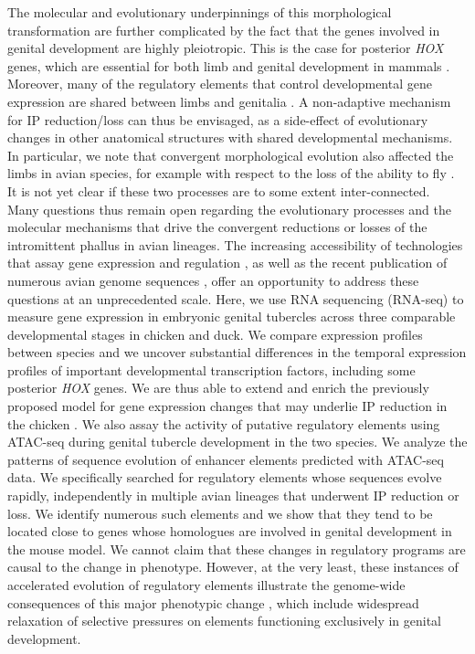 The molecular and evolutionary underpinnings of this morphological transformation are further complicated by the fact that the genes involved in genital development are highly pleiotropic. This is the case for posterior \textit{HOX} genes, which are essential for both limb and genital development in mammals \citep{mortlock_mutation_1997}. Moreover, many of the regulatory elements that control developmental gene expression are shared between limbs and genitalia \citep{lonfat_convergent_2014,infante_shared_2015}. A non-adaptive mechanism for IP reduction/loss can thus be envisaged, as a side-effect of evolutionary changes in other anatomical structures with shared developmental mechanisms. In particular, we note that convergent morphological evolution also affected the limbs in avian species, for example with respect to the loss of the ability to fly \citep{sackton_convergent_2019}. It is not yet clear if these two processes are to some extent inter-connected. \\

Many questions thus remain open regarding the evolutionary processes and the molecular mechanisms that drive the convergent reductions or losses of the intromittent phallus in avian lineages. The increasing accessibility of technologies that assay gene expression and regulation \citep{buenrostro_transposition_2013,wang_rna-seq_2009}, as well as the recent publication of numerous avian genome sequences \citep{feng_dense_2020}, offer an opportunity to address these questions at an unprecedented scale. Here, we use RNA sequencing (RNA-seq) to measure gene expression in embryonic genital tubercles across three comparable developmental stages in chicken and duck. We compare expression profiles between species and we uncover substantial differences in the temporal expression profiles of important developmental transcription factors, including some posterior \textit{HOX} genes. We are thus able to extend and enrich the previously proposed model for gene expression changes that may underlie IP reduction in the chicken \citep{herrera_developmental_2013}. We also assay the activity of putative regulatory elements using ATAC-seq during genital tubercle development in the two species. We analyze the patterns of sequence evolution of enhancer elements predicted with ATAC-seq data. We specifically searched for regulatory elements whose sequences evolve rapidly, independently in multiple avian lineages that underwent IP reduction or loss. We identify numerous such elements and we show that they tend to be located close to genes whose homologues are involved in genital development in the mouse model. We cannot claim that these changes in regulatory programs are causal to the change in phenotype. However, at the very least, these instances of accelerated evolution of regulatory elements illustrate the genome-wide consequences of this major phenotypic change \citep{hiller_forward_2012}, which include widespread relaxation of selective pressures on elements functioning exclusively in genital development. 



